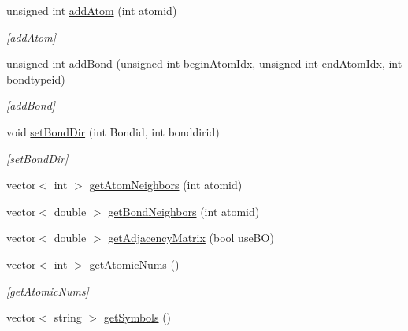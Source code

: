 \begin{DoxyCompactItemize}
unsigned int \mbox{\hyperlink{class_molecule_a2ef7b76adda28cd4932d07c35d330f71}{add\+Atom}} (int atomid)
\begin{DoxyCompactList}\small\item\em \mbox{[}add\+Atom\mbox{]} \end{DoxyCompactList}\item 
unsigned int \mbox{\hyperlink{class_molecule_ad1c8dfe8ea7c2026bcdbdd2c90fa17b8}{add\+Bond}} (unsigned int begin\+Atom\+Idx, unsigned int end\+Atom\+Idx, int bondtypeid)
\begin{DoxyCompactList}\small\item\em \mbox{[}add\+Bond\mbox{]} \end{DoxyCompactList}\item 
void \mbox{\hyperlink{class_molecule_a21ccf25eb7aa1fb6c5827a7c6c01d926}{set\+Bond\+Dir}} (int Bondid, int bonddirid)
\begin{DoxyCompactList}\small\item\em \mbox{[}set\+Bond\+Dir\mbox{]} \end{DoxyCompactList}\item 
vector$<$ int $>$ \mbox{\hyperlink{class_molecule_a8a7e0db0469ed164e76f4fc48f4e387b}{get\+Atom\+Neighbors}} (int atomid)
\item 
vector$<$ double $>$ \mbox{\hyperlink{class_molecule_a8b75895f9b9d0c50fa856b0d5289bf5f}{get\+Bond\+Neighbors}} (int atomid)
\item 
vector$<$ double $>$ \mbox{\hyperlink{class_molecule_a7ee37a53f63c296a206a20b69808cff8}{get\+Adjacency\+Matrix}} (bool use\+BO)
\item 
vector$<$ int $>$ \mbox{\hyperlink{class_molecule_ac4010a4be90b8f109903d41a05d3ff81}{get\+Atomic\+Nums}} ()
\begin{DoxyCompactList}\small\item\em \mbox{[}get\+Atomic\+Nums\mbox{]} \end{DoxyCompactList}\item 
vector$<$ string $>$ \mbox{\hyperlink{class_molecule_afe8104a0a538fe6b64c089d409871f0d}{get\+Symbols}} ()
\end{DoxyCompactItemize}
